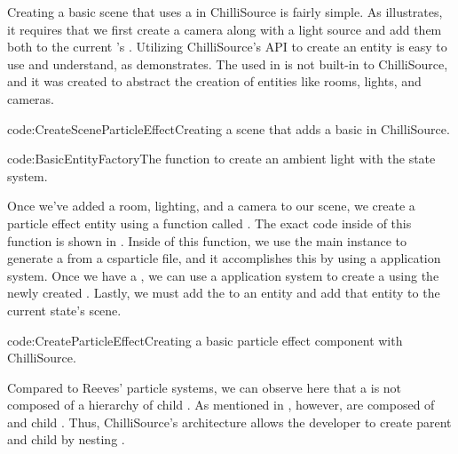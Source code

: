 Creating a basic scene that uses a  in ChilliSource is fairly simple. As  illustrates, it requires that we first create a camera along with a light source and add them both to the current 's . Utilizing ChilliSource's API to create an entity is easy to use and understand, as  demonstrates\footnotemark. The  used in  is not built-in to ChilliSource, and it was created to abstract the creation of entities like rooms, lights, and cameras.


{code:CreateSceneParticleEffect}{Creating a scene that adds a basic  in ChilliSource.}

{code:BasicEntityFactory}{The function to create an ambient light with the  state system.}

Once we've added a room, lighting, and a camera to our scene, we create a particle effect entity using a function called . The exact code inside of this function is shown in . Inside of this function, we use the main  instance to generate a  from a csparticle file, and it accomplishes this by using a  application system. Once we have a , we can use a  application system to create a  using the newly created . Lastly, we must add the  to an entity and add that entity to the current state's scene.

{code:CreateParticleEffect}{Creating a basic particle effect component with ChilliSource.}

Compared to Reeves' particle systems, we can observe here that a  is not composed of a hierarchy of child . As mentioned in , however,  are composed of  and child . Thus, ChilliSource's architecture allows the developer to create parent and child  by nesting . 



